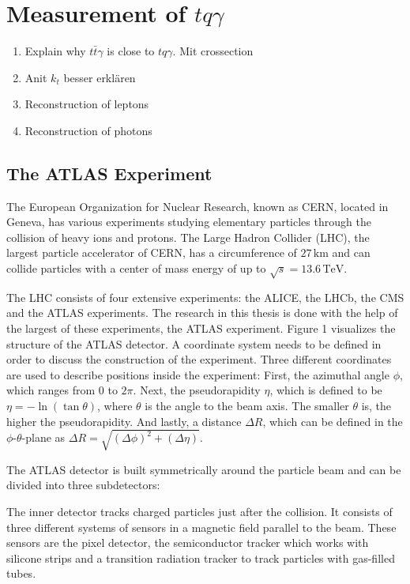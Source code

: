 


\chapter{Measurement of \texorpdfstring{$tq\gamma$}{tqGamma}}
\label{chap:measurement}

\begin{enumerate}
    \item Explain why $t\bar{t}\gamma$ is close to $tq\gamma$. Mit crossection
    \item Anit $k_t$ besser erklären
    \item Reconstruction of leptons
    \item Reconstruction of photons
\end{enumerate}
\section{The ATLAS Experiment}
\label{sec:atlas}
The European Organization for Nuclear Research, known as CERN, located in Geneva, has various experiments studying elementary particles through the collision of heavy ions and protons. 
The Large Hadron Collider (LHC), the largest particle accelerator of CERN, has a circumference of $27 \,\si{\kilo\metre}$ and can collide particles with a center of mass energy of up to $\sqrt{s} = 13.6 \,\si{\tera\electronvolt}$. 


The LHC consists of four extensive experiments: the ALICE, the LHCb, the CMS and the ATLAS experiments. The research in this thesis is done with the help of the largest of these experiments, the ATLAS experiment. Figure 1 visualizes the structure of the ATLAS detector. 
A coordinate system needs to be defined in order to discuss the construction of the experiment. Three different coordinates are used to describe positions inside the experiment: First, the azimuthal angle $\phi$, which ranges from $0$ to $2\pi$. 
Next, the pseudorapidity $\eta$, which is defined to be $\eta = -\ln(\tan \theta)$, where $\theta$ is the angle to the beam axis. The smaller $\theta$ is, the higher the pseudorapidity. And lastly, a distance $\Delta R$, which can be defined in the $\phi$-$\theta$-plane as $\Delta R = \sqrt{(\Delta \phi)^2 +(\Delta \eta)}$.

The ATLAS detector is built symmetrically around the particle beam and can be divided into three subdetectors:

The inner detector tracks charged particles just after the collision. 
It consists of three different systems of sensors in a magnetic field parallel to the beam. 
These sensors are the pixel detector, the semiconductor tracker which works with silicone strips and a transition radiation tracker to track particles with gas-filled tubes. 

